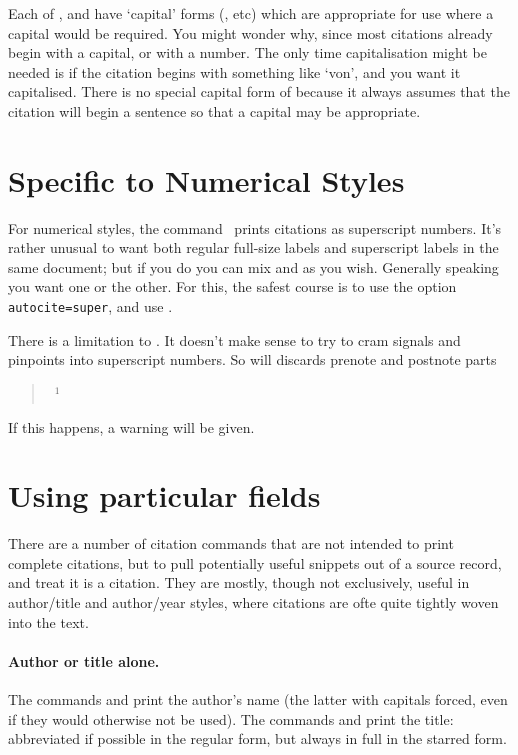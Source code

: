 Each of ,  and  have `capital'
forms (, etc) which are appropriate for use where a capital
would be required. You might wonder why, since most citations
already begin with a capital, or with a number. The only time
capitalisation might be needed is if the citation begins with
something like `von', and you want it capitalised. There is no special
capital form of  because it always assumes that the
citation will begin a sentence so that a capital may be appropriate.

\section{Specific to Numerical Styles}

For numerical styles, the command \ prints citations as
superscript numbers. It’s rather unusual to want both regular
full-size labels and superscript labels in the same document; but if
you do you can mix  and  as you wish. Generally
speaking you want one or the other. For this, the safest course is to
use the option \texttt{autocite=super}, and use .

There is a limitation to . It doesn't make sense to try to
cram signals and pinpoints into superscript numbers. So 
will discards prenote and postnote parts
\begin{quote}
 \gives\ $^1$
\end{quote}
If this happens, a warning will be given.

\section{Using particular fields}

There are a number of citation commands that are not intended to print
complete citations, but to pull potentially useful snippets out of a
source record, and treat it is a citation. They are mostly, though not
exclusively, useful in author/title and author/year styles, where
citations are ofte quite tightly woven into the text.

\paragraph{Author or title alone.} The commands  and
 print the author's name (the latter with capitals
forced, even if they would otherwise not be used). The commands
 and  print the title: abbreviated if
possible in the regular form, but always in full in the starred form.

